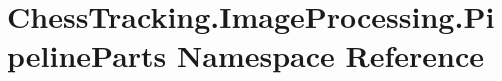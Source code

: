 \hypertarget{namespace_chess_tracking_1_1_image_processing_1_1_pipeline_parts}{}\section{Chess\+Tracking.\+Image\+Processing.\+Pipeline\+Parts Namespace Reference}
\label{namespace_chess_tracking_1_1_image_processing_1_1_pipeline_parts}
